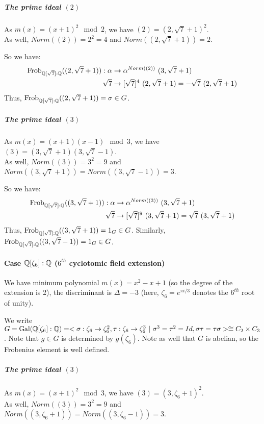 \subparagraph{The prime ideal $(2)$}
As $m(x) = (x+1)^2 \mod 2$, we have $(2) = (2, \sqrt{7}+1)^2$.\\
As well, $Norm((2)) = 2^2 = 4$ and $Norm((2, \sqrt{7}+1)) = 2$.

So we have:
\begin{align*}
    \text{Frob}_{\mathbb{Q}[\sqrt{7}]:\mathbb{Q}}((2, \sqrt{7}+1)): \alpha &\to \alpha^{Norm((2))} \ (3, \sqrt{7}+1)\\
    \sqrt{7} &\to [\sqrt{7}]^4 \ (2, \sqrt{7}+1) = -\sqrt{7} \ (2, \sqrt{7}+1) 
\end{align*}
Thus, $\text{Frob}_{\mathbb{Q}[\sqrt{7}]:\mathbb{Q}}((2, \sqrt{7}+1)) = \sigma \in G$.

\subparagraph{The prime ideal $(3)$}
As $m(x) = (x+1)(x-1) \mod 3$, we have $(3) = (3, \sqrt{7}+1)(3, \sqrt{7}-1)$.\\
As well, $Norm((3)) = 3^2 = 9$ and $Norm((3, \sqrt{7}+1)) = Norm((3, \sqrt{7}-1)) = 3$.

So we have:
\begin{align*}
    \text{Frob}_{\mathbb{Q}[\sqrt{7}]:\mathbb{Q}}((3, \sqrt{7}+1)): \alpha&\to \alpha^{Norm((3))} \ (3, \sqrt{7}+1)\\
    \sqrt{7}&\to [\sqrt{7}]^9 \ (3, \sqrt{7}+1) = \sqrt{7} \ (3, \sqrt{7}+1)
\end{align*}
Thus, $\text{Frob}_{\mathbb{Q}[\sqrt{7}]:\mathbb{Q}}((3, \sqrt{7}+1)) = 1_G \in G$.
Similarly, $\text{Frob}_{\mathbb{Q}[\sqrt{7}]:\mathbb{Q}}((3, \sqrt{7}-1)) = 1_G \in G$.

\paragraph{Case $\mathbb{Q}[\zeta_6]:\mathbb{Q}$ ($6^{th}$ cyclotomic field extension)}
We have minimum polynomial $m(x)=x^2-x+1$ (so the degree of the extension is 2), the discriminant is $\Delta = -3$ (here, $\zeta_6=e^{\pi i/3}$ denotes the $6^{th}$ root of unity).

We write $G = \Gal{\Q[\zeta_6]:\Q} = < \sigma: \zeta_6 \to \zeta_6^2, \tau: \zeta_6 \to \zeta_6^3 \ | \ \sigma^3=\tau^2=Id, \sigma\tau=\tau\sigma > \cong C_2 \times C_3$.
Note that $g \in G$ is determined by $g(\zeta_6)$.
Note as well that $G$ is abelian, so the Frobenius element is well defined.

\subparagraph{The prime ideal $(3)$}
As $m(x) = (x+1)^2 \mod 3$, we have $(3) = (3, \zeta_6+1)^2$.\\
As well, $Norm((3)) = 3^2 = 9$ and $Norm((3, \zeta_6+1)) = Norm((3, \zeta_6-1)) = 3$.

